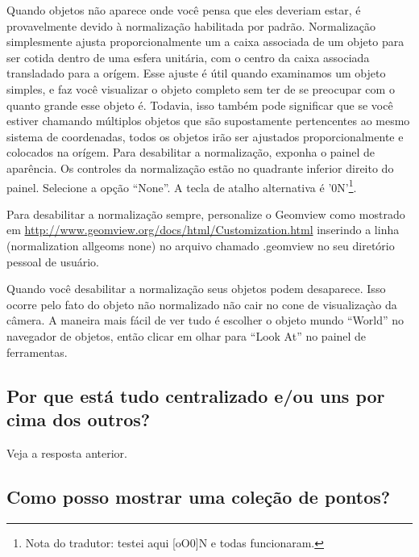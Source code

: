 \documentclass[12pt,a4paper]{article}
\begin{document}
        Quando objetos n\~ao aparece onde voc\^e pensa que eles deveriam estar, \'e provavelmente
        devido \`a normaliza\c{c}\~ao habilitada por padr\~ao. Normaliza\c{c}\~ao simplesmente ajusta proporcionalmente um
        a caixa associada de um objeto para ser cotida dentro de uma esfera unit\'aria, com o centro da
        caixa associada transladado para a or\'igem. Esse ajuste \'e \'util quando examinamos um
        objeto simples, e faz voc\^e visualizar o objeto completo sem ter de se
        preocupar com o quanto grande esse objeto \'e. Todavia, isso tamb\'em pode significar que se voc\^e estiver chamando
        m\'ultiplos objetos que s\~ao supostamente pertencentes ao mesmo sistema de
        coordenadas, todos os objetos ir\~ao ser ajustados proporcionalmente e colocados na or\'igem. Para desabilitar
        a normaliza\c{c}\~ao, exponha o painel de apar\^encia. Os controles da
        normaliza\c{c}\~ao est\~ao no quadrante inferior direito do painel. Selecione a op\c{c}\~ao
        ``None''. A tecla de atalho alternativa \'e '0N'\footnote{Nota do tradutor: testei aqui [oO0]N e todas funcionaram.}.

        Para desabilitar a normaliza\c{c}\~ao sempre, personalize o Geomview
        como mostrado em \url{http://www.geomview.org/docs/html/Customization.html}
        inserindo a linha (normalization allgeoms
        none) no arquivo chamado .geomview no seu diret\'{o}rio pessoal de usu\'ario.

        Quando voc\^e desabilitar a normaliza\c{c}\~ao seus objetos podem desaparece. Isso ocorre
        pelo fato do objeto n\~ao normalizado n\~ao cair no cone de visualiza\c{c}\`ao da
        c\^amera. A maneira mais f\'acil de ver tudo \'e escolher o objeto mundo ``World''
        no navegador de objetos, ent\~ao clicar em olhar para ``Look At'' no painel de ferramentas.

    \subsection{Por que est\'a tudo centralizado e/ou uns por cima dos outros?}

        Veja a resposta anterior.

    \subsection{Como posso mostrar uma cole\c{c}\~ao de pontos?}
\end{document}
